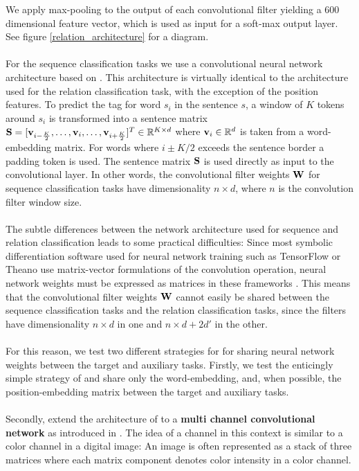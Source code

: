 We apply max-pooling to the output of each convolutional filter yielding a 600 dimensional feature vector, which is used as input for a soft-max output layer. See figure \ref{relation_architecture} for a diagram.
\\\\
For the sequence classification tasks we use a convolutional neural network architecture based on \citet{collobert2011}. This architecture is virtually identical to the architecture used for the relation classification task, with the exception of the position features. To predict the tag for word $s_i$ in the sentence $s$, a window of $K$ tokens around $s_i$ is transformed into a sentence matrix $\mathbf{S} = [\mathbf{v}_{i - \frac{K}{2}},\dots,\mathbf{v}_i,\dots,\mathbf{v}_{i + \frac{K}{2}}]^T \in \mathbb{R}^{K \times d}$ where $\mathbf{v}_i \in \mathbb{R}^d$ is taken from a word-embedding matrix. For words where $i \pm K / 2$ exceeds the sentence border a padding token is used. The sentence matrix $\mathbf{S}$ is used directly as input to the convolutional layer. In other words, the convolutional filter weights $\mathbf{W}$ for sequence classification tasks have dimensionality $n \times d$, where $n$ is the convolution filter window size.
\\\\
The subtle differences between the network architecture used for sequence and relation classification leads to some practical difficulties: Since most symbolic differentiation software used for neural network training such as TensorFlow or Theano use matrix-vector formulations of the convolution operation, neural network weights must be expressed as matrices in these frameworks \citep{abadi2016, theano2016}. This means that the convolutional filter weights $\mathbf{W}$ cannot easily be shared between the sequence classification tasks and the relation classification tasks, since the filters have dimensionality $n \times d$ in one and $n \times d + 2d'$ in the other.
\\\\
For this reason, we test two different strategies for for sharing neural network weights between the target and auxiliary tasks. Firstly, we test the enticingly simple strategy of \citet{collobert2008} and share only the word-embedding, and, when possible, the position-embedding matrix between the target and auxiliary tasks. 
\\\\
Secondly, extend the architecture of \citet{nguyen2015} to a \textbf{multi channel convolutional network} as introduced in \cite{kim2014}. The idea of a channel in this context is similar to a color channel in a digital image: An image is often represented as a stack of three matrices where each matrix component denotes color intensity in a color channel.
